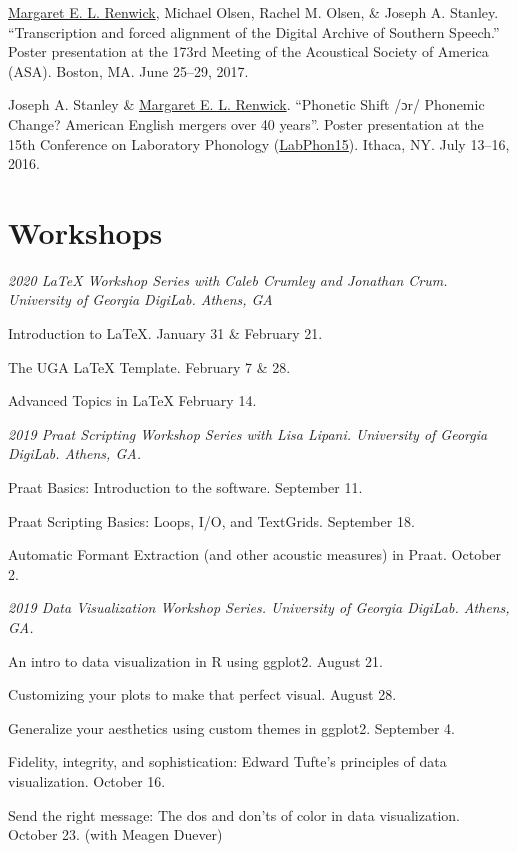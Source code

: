 \documentclass[
]{article}
\begin{document}
\href{http://faculty.franklin.uga.edu/mrenwick/}{Margaret E. L.
Renwick}, Michael Olsen, Rachel M. Olsen, \& {Joseph A. Stanley}.
``Transcription and forced alignment of the Digital Archive of Southern
Speech.'' Poster presentation at the 173rd Meeting of the Acoustical
Society of America (ASA). Boston, MA. June 25--29, 2017.

{Joseph A. Stanley} \&
\href{http://faculty.franklin.uga.edu/mrenwick/}{Margaret E. L.
Renwick}. ``Phonetic Shift {/ɔr/} Phonemic Change? American English
mergers over 40 years''. Poster presentation at the 15th Conference on
Laboratory Phonology (\href{http://labphon.org/labphon15/}{LabPhon15}).
Ithaca, NY. July 13--16, 2016.

\hypertarget{workshops}{%
\section{Workshops}\label{workshops}}

\emph{2020 LaTeX Workshop Series with Caleb Crumley and Jonathan Crum.
University of Georgia DigiLab. Athens, GA}

Introduction to LaTeX. January 31 \& February 21.

The UGA LaTeX Template. February 7 \& 28.

Advanced Topics in LaTeX February 14.

\emph{2019 Praat Scripting Workshop Series with Lisa Lipani. University
of Georgia DigiLab. Athens, GA.}

Praat Basics: Introduction to the software. September 11.

Praat Scripting Basics: Loops, I/O, and TextGrids. September 18.

Automatic Formant Extraction (and other acoustic measures) in Praat.
October 2.

\emph{2019 Data Visualization Workshop Series. University of Georgia
DigiLab. Athens, GA.}

An intro to data visualization in R using ggplot2. August 21.

Customizing your plots to make that perfect visual. August 28.

Generalize your aesthetics using custom themes in ggplot2. September 4.

Fidelity, integrity, and sophistication: Edward Tufte's principles of
data visualization. October 16.

Send the right message: The dos and don'ts of color in data
visualization. October 23. (with Meagen Duever)
\end{document}
